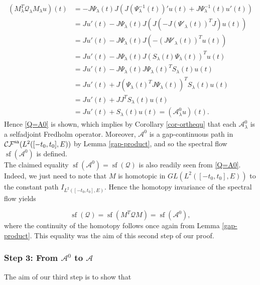\documentclass[a4paper,10pt]{article}
\DeclareMathOperator{\sfl}{sf}
\begin{document}
\begin{align*}
(M^T_\lambda\mathcal{Q}_\lambda M_\lambda u)(t)&=-J\Psi_\lambda(t)J(J(\Psi^{-1}_\lambda(t))'u(t)+J\Psi^{-1}_\lambda(t)u'(t))\\
&=Ju'(t)-J\Psi_\lambda(t)J(J(-J(\Psi'_\lambda(t))^TJ)u(t))\\
&=Ju'(t)-J\Psi_\lambda(t)J(-(J\Psi'_\lambda(t))^Tu(t))\\
&=Ju'(t)-J\Psi_\lambda(t)J(S_\lambda(t)\Psi_\lambda(t))^Tu(t)\\
&=Ju'(t)-J\Psi_\lambda(t)J\Psi_\lambda(t)^TS_\lambda(t)u(t)\\
&=Ju'(t)+J(\Psi_\lambda(t)^TJ\Psi_\lambda(t))^TS_\lambda(t)u(t)\\
&=Ju'(t)+JJ^TS_\lambda(t)u(t)\\
&=Ju'(t)+S_\lambda(t)u(t)=(\mathcal{A}^0_\lambda u)(t).
\end{align*}
Hence \eqref{Q=A0} is shown, which implies by Corollary \ref{cor-orthequ} that each $\mathcal{A}^0_\lambda$ is a selfadjoint Fredholm operator. Moreover, $\mathcal{A}^0$ is a gap-continuous path in $\mathcal{CF}^\textup{sa}(L^2([-t_0,t_0],E))$ by Lemma \ref{gap-product}, and so the spectral flow $\sfl(\mathcal{A}^0)$ is defined.\\
The claimed equality $\sfl(\mathcal{A}^0)=\sfl(\mathcal{Q})$ is also readily seen from \eqref{Q=A0}. Indeed, we just need to note that $M$ is homotopic in $GL(L^2([-t_0,t_0],E))$ to the constant path $I_{L^2([-t_0,t_0],E)}$. Hence the homotopy invariance of the spectral flow yields

\[\sfl(\mathcal{Q})=\sfl(M^T\mathcal{Q}M)=\sfl(\mathcal{A}^0),\] 
where the continuity of the homotopy follows once again from Lemma \ref{gap-product}. This equality was the aim of this second step of our proof. 




\subsubsection*{Step 3: From $\mathcal{A}^0$ to $\mathcal{A}$}
The aim of our third step is to show that 
\end{document}
